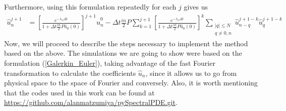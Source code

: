 		Furthermore, using this formulation repeatedly for each $j$ gives us
		\begin{align}
		\label{Galerkin_Euler}
			\hat{u}^{j+1}_n &= \left[ \frac{ e^{- \lambda_n \Delta t}}{ 1 + \Delta t \frac{in}{2} P \hat{u}_0 (0) } \right]^{j+1} \hat{u}^0_n - \Delta t \frac{in}{2} P \sum_{k=1}^{j+1} \left[ \frac{ e^{- \lambda_n \Delta t}}{ 1 + \Delta t \frac{in}{2} P \hat{u}_0 (0) } \right]^{k}  \sum_{\substack{|q|\leq N \\ q \neq 0, n}} \hat{u}^{j+1-k}_{n - q} \hat{u}^{j+1-k}_q
		\end{align}
		Now, we will proceed to describe the steps necessary to implement the method based on the above. The simulations we are going to show were based on the formulation (\ref{Galerkin_Euler}), taking advantage of the fast Fourier transformation to calculate the coefficients $\hat{u}_n$, since it allows us to go from physical space to the space of Fourier and conversely. Also, it is worth mentioning that the codes used in this work can be found at \url{https://github.com/alanmatzumiya/pySpectralPDE.git}. \\ 
		
